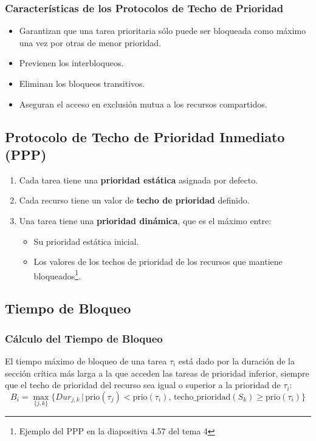 \documentclass[a4paper,12pt]{article}
\begin{document}
\subsubsection{Características de los Protocolos de Techo de Prioridad}
\begin{itemize}
    \item Garantizan que una tarea prioritaria sólo puede ser bloqueada como máximo una vez por otras de menor prioridad.
    \item Previenen los interbloqueos.
    \item Eliminan los bloqueos transitivos.
    \item Aseguran el acceso en exclusión mutua a los recursos compartidos.
\end{itemize}

\subsection{Protocolo de Techo de Prioridad Inmediato (PPP)}

\begin{enumerate}
    \item Cada tarea tiene una \textbf{prioridad estática} asignada por defecto.
    \item Cada recurso tiene un valor de \textbf{techo de prioridad} definido.
    \item Una tarea tiene una \textbf{prioridad dinámica}, que es el máximo entre:
    \begin{itemize}
        \item Su prioridad estática inicial.
        \item Los valores de los techos de prioridad de los recursos que mantiene bloqueados\footnote{Ejemplo del PPP en la diapositiva 4.57 del tema 4}.
    \end{itemize}
\end{enumerate}

\subsection{Tiempo de Bloqueo}

\subsubsection{Cálculo del Tiempo de Bloqueo}
El tiempo máximo de bloqueo de una tarea \(\tau_i\) está dado por la duración de la sección crítica más larga a la que acceden las tareas de prioridad inferior, siempre que el techo de prioridad del recurso sea igual o superior a la prioridad de \(\tau_i\):
\[
B_i = \max_{\{j,k\}} \{Dur_{j,k} \, | \, \text{prio}(\tau_j) < \text{prio}(\tau_i), \, \text{techo\_prioridad}(S_k) \geq \text{prio}(\tau_i)\}
\]
\end{document}
